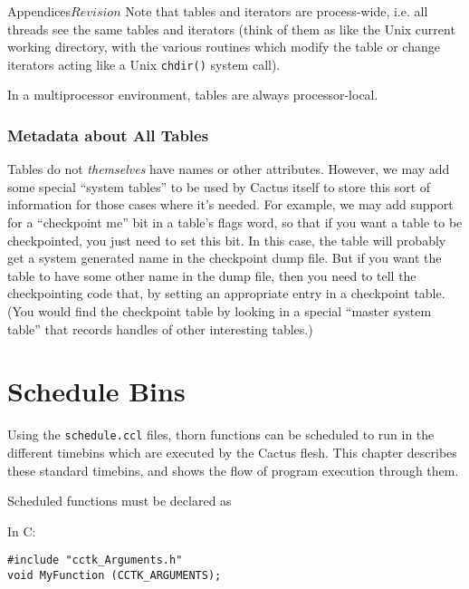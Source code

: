 \begin{cactuspart}{Appendices}{}{$Revision$}
Note that tables and iterators are process-wide, i.e. all
threads see the same tables and iterators (think of them as like the
Unix current working directory, with the various routines which modify
the table or change iterators acting like a Unix \verb|chdir()| system
call).

In a multiprocessor environment, tables are always processor-local.


\subsection{Metadata about All Tables}

Tables do not \emph{themselves} have names or other
attributes.  However, we may add some special
``system tables'' to be used by Cactus itself to store this sort of
information for those cases where it's needed. For example, we may add support for a
``checkpoint me'' bit in a table's flags word, so that if you want a
table to be checkpointed, you just need to set this bit.
In this case, the table will probably get a system generated name in
the checkpoint dump file.  But if you want the table to have some
other name in the dump file, then you need to tell the checkpointing
code that, by setting an appropriate entry in a checkpoint table.
(You would find the checkpoint table by looking in a special
``master system table'' that records handles of other interesting tables.)



\chapter{Schedule Bins}
\label{sec:Appendix.schedule_bins}

Using the {\tt schedule.ccl} files, thorn functions can be scheduled to run 
in the different timebins which are executed by the Cactus flesh. This chapter
describes these standard timebins, and shows the flow of program execution
through them.

Scheduled functions must be declared as
\begin{Lentry}

\item[In C:]
\begin{verbatim}
#include "cctk_Arguments.h"
void MyFunction (CCTK_ARGUMENTS);
\end{verbatim}


\end{Lentry}
\end{cactuspart}

